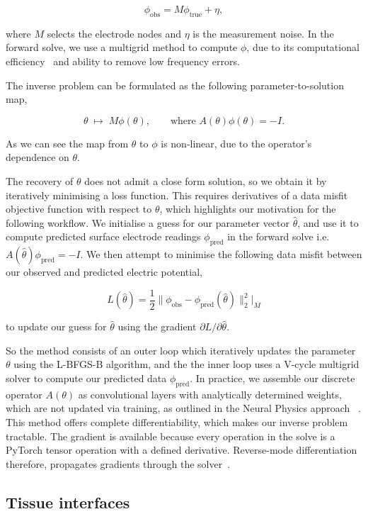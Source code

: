 \documentclass[final-report]{report-template}
\begin{document}
$$
\phi_{\text{obs}} = M\phi_{\text{true}} + \eta,
$$

where $M$ selects the electrode nodes and $\eta$ is the measurement noise. In the forward solve, we use a multigrid method to compute $\phi$, due to its computational efficiency~\cite{chen2026} and ability to remove low frequency errors.

The inverse problem can be formulated as the following parameter-to-solution map,

$$
\theta \;\longmapsto\; M\phi(\theta),
\qquad
\text{where } A(\theta)\phi(\theta)=-I.
$$


As we can see the map from $\theta$ to $\phi$ is non-linear, due to the operator's dependence on $\theta$.

The recovery of $\theta$ does not admit a close form solution, so we obtain it by iteratively minimising a loss function. This requires derivatives of a data misfit objective function with respect to $\theta$, which highlights our motivation for the following workflow. We initialise a guess for our parameter vector $\hat{\theta}$, and use it to compute predicted surface electrode readings $\phi_{\text{pred}}$ in the forward solve i.e. $A(\hat{\theta})\phi_{\text{pred}} = -I$. We then attempt to minimise the following data misfit between our observed and predicted electric potential,

$$
L(\hat\theta) = \frac{1}{2}\bigl\lVert \phi_{\text{obs}} - \phi_{\text{pred}}(\hat\theta) \bigr\rVert_2^2\Big|_{M}
$$

to update our guess for $\hat{\theta}$ using the gradient $\partial L / \partial \hat{\theta}$.

So the method consists of an outer loop which iteratively updates the parameter $\theta$ using the L-BFGS-B algorithm, and the the inner loop uses a V-cycle multigrid solver to compute our predicted data $\phi_{\text{pred}}$. In practice, we assemble our discrete operator $A(\theta)$ as convolutional layers with analytically determined weights, which are not updated via training, as outlined in the Neural Physics approach ~\cite{chen2026}. This method offers complete differentiability, which makes our inverse problem tractable. The gradient is available because every operation in the solve is a PyTorch tensor operation with a defined derivative. Reverse-mode differentiation therefore, propagates gradients through the solver~\cite{paszke2019}.

\subsection{Tissue interfaces}
\label{sec:tissue-interface}
\end{document}
